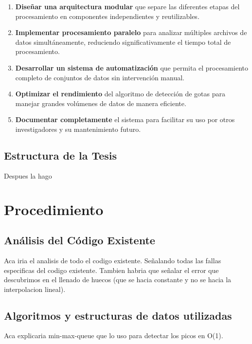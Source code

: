 \documentclass[12pt,a4paper]{article}
\begin{document}
\begin{enumerate}
    \item \textbf{Diseñar una arquitectura modular} que separe las diferentes etapas del procesamiento en componentes independientes y reutilizables.
    
    \item \textbf{Implementar procesamiento paralelo} para analizar múltiples archivos de datos simultáneamente, reduciendo significativamente el tiempo total de procesamiento.
    
    \item \textbf{Desarrollar un sistema de automatización} que permita el procesamiento completo de conjuntos de datos sin intervención manual.
    
    \item \textbf{Optimizar el rendimiento} del algoritmo de detección de gotas para manejar grandes volúmenes de datos de manera eficiente.
    
    \item \textbf{Documentar completamente} el sistema para facilitar su uso por otros investigadores y su mantenimiento futuro.
\end{enumerate}

\subsection{Estructura de la Tesis}

Despues la hago

\section{Procedimiento}

\subsection{Análisis del Código Existente}

Aca iria el analisis de todo el codigo existente. Señalando todas las fallas especificas del codigo existente. Tambien habria que señalar el error que descubrimos en el llenado de huecos (que se hacia constante y no se hacia la interpolacion lineal).

\subsection{Algoritmos y estructuras de datos utilizadas}

Aca explicaria min-max-queue que lo uso para detectar los picos en O(1).
\end{document}
